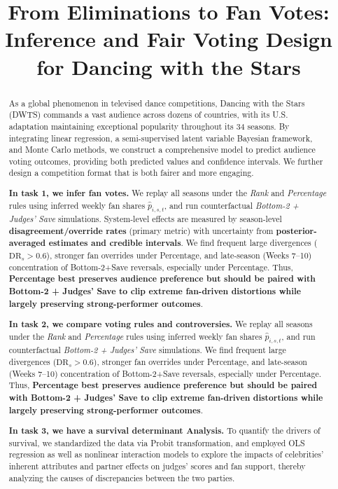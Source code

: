 \documentclass[12pt]{article}
\title{From Eliminations to Fan Votes: Inference and Fair Voting Design for Dancing with the Stars}  %
\begin{document}
	\begin{abstract}
		
		As a global phenomenon in televised dance competitions, Dancing with the Stars (DWTS) commands a vast audience across dozens of countries, with its U.S. adaptation maintaining exceptional popularity throughout its 34 seasons. By integrating linear regression, a semi-supervised latent variable Bayesian framework, and Monte Carlo methods, we construct a comprehensive model to predict audience voting outcomes, providing both predicted values and confidence intervals. We further design a competition format that is both fairer and more engaging.
		
		\noindent \textbf{In task 1, we infer fan votes.}
		We replay all seasons under the \emph{Rank} and \emph{Percentage} rules using inferred weekly fan shares $\hat p_{i,s,t}$, and run counterfactual \emph{Bottom-2 + Judges’ Save} simulations. System-level effects are measured by season-level \textbf{disagreement/override rates} (primary metric) with uncertainty from \textbf{posterior-averaged estimates and credible intervals}. We find frequent large divergences ($\mathrm{DR}_s>0.6$), stronger fan overrides under Percentage, and late-season (Weeks 7--10) concentration of Bottom-2+Save reversals, especially under Percentage. Thus, \textbf{Percentage best preserves audience preference but should be paired with Bottom-2 + Judges’ Save to clip extreme fan-driven distortions while largely preserving strong-performer outcomes}.
		
		\noindent \textbf{In task 2, we compare voting rules and controversies.}
		We replay all seasons under the \emph{Rank} and \emph{Percentage} rules using inferred weekly fan shares $\hat p_{i,s,t}$, and run counterfactual \emph{Bottom-2 + Judges’ Save} simulations. We find frequent large divergences ($\mathrm{DR}_s>0.6$), stronger fan overrides under Percentage, and late-season (Weeks 7--10) concentration of Bottom-2+Save reversals, especially under Percentage. Thus, \textbf{Percentage best preserves audience preference but should be paired with Bottom-2 + Judges’ Save to clip extreme fan-driven distortions while largely preserving strong-performer outcomes}.
		
		\noindent \textbf{In task 3, we have a survival determinant Analysis.}
		To quantify the drivers of survival, we standardized the data via Probit transformation, and employed OLS regression as well as nonlinear interaction models to explore the impacts of celebrities' inherent attributes and partner effects on judges' scores and fan support, thereby analyzing the causes of discrepancies between the two parties. 
		

\end{abstract}
\end{document}
